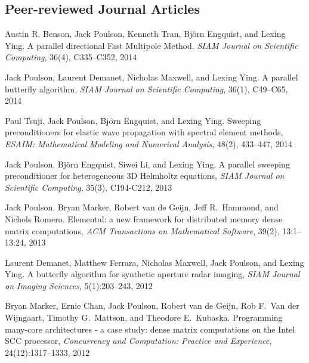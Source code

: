 \documentclass[letterpaper]{article}
\renewenvironment{itemize}{
  \begin{list}{}{
    \setlength{\leftmargin}{1.5em}
  }
}{
  \end{list}
}
\begin{document}
\subsection*{Peer-reviewed Journal Articles}

\begin{itemize}

\item Austin R. Benson, Jack Poulson, Kenneth Tran, Bj\"orn Engquist, and Lexing Ying.
A parallel directional Fast Multipole Method. {\it SIAM Journal on Scientific Computing},
36(4), C335--C352, 2014

\item Jack Poulson, Laurent Demanet, Nicholas Maxwell, and Lexing Ying.
A parallel butterfly algorithm, {\it SIAM Journal on Scientific Computing},
36(1), C49--C65, 2014

\item Paul Tsuji, Jack Poulson, Bj\"orn Engquist, and Lexing Ying.
Sweeping preconditioners for elastic wave propagation with spectral element
methods, {\it ESAIM: Mathematical Modeling and Numerical Analysis},
48(2), 433--447, 2014

\item Jack Poulson, Bj\"orn Engquist, Siwei Li, and Lexing Ying.
A parallel sweeping preconditioner for heterogeneous 3D Helmholtz equations, 
{\it SIAM Journal on Scientific Computing}, 35(3), C194-C212, 2013

\item Jack Poulson, Bryan Marker, Robert van de Geijn, Jeff R.\ Hammond, and 
Nichols Romero. Elemental: a new framework for distributed memory dense matrix 
computations, {\it ACM Transactions on Mathematical Software}, 39(2), 
13:1--13:24, 2013

\item Laurent Demanet, Matthew Ferrara, Nicholas Maxwell, Jack Poulson, and 
Lexing Ying. A butterfly algorithm for synthetic aperture radar imaging,
{\it SIAM Journal on Imaging Sciences}, 5(1):203--243, 2012

\item Bryan Marker, Ernie Chan, Jack Poulson, Robert van de Geijn, 
Rob F.\ Van der Wijngaart, Timothy G.\ Mattson, and Theodore E.\ Kubaska.
Programming many-core architectures - a case study: dense matrix computations on the Intel SCC processor, {\it Concurrency and Computation: Practice and 
Experience}, 24(12):1317--1333, 2012

\end{itemize}
\end{document}

